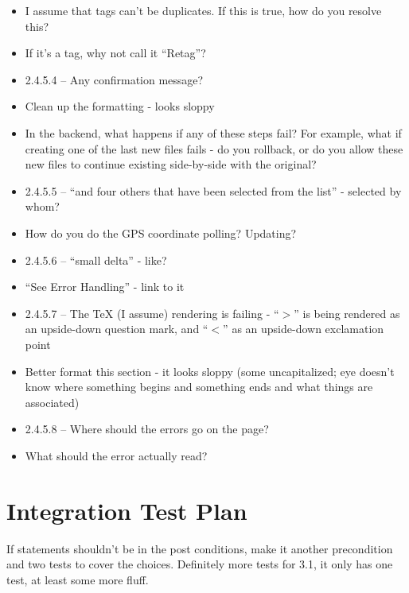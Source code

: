 \documentclass{article}
\begin{document}
\begin{itemize}
\begin{itemize}
\begin{itemize}
            \item I assume that tags can't be duplicates.  If this is true, how do you resolve this?
            \item If it's a tag, why not call it ``Retag''?
            \item 2.4.5.4 -- Any confirmation message?
            \item Clean up the formatting - looks sloppy
            \item In the backend, what happens if any of these steps fail?  For example, what if creating one of the last new files fails - do you rollback, or do you allow these new files to continue existing side-by-side with the original?
            \item 2.4.5.5 -- ``and four others that have been selected from the list'' - selected by whom?
            \item How do you do the GPS coordinate polling?  Updating?
            \item 2.4.5.6 -- ``small delta'' - like?
            \item ``See Error Handling'' - link to it
            \item 2.4.5.7 -- The TeX (I assume) rendering is failing - ``$>$'' is being rendered as an upside-down question mark, and ``$<$'' as an upside-down exclamation point
            \item Better format this section - it looks sloppy (some uncapitalized; eye doesn't know where something begins and something ends and what things are associated)
            \item 2.4.5.8 -- Where should the errors go on the page?  
            \item What should the error actually read?
        \end{itemize}
    \end{itemize}
\end{itemize}


\section{Integration Test Plan}

If statements shouldn't be in the post conditions, make it another precondition
and two tests to cover the choices.  Definitely more tests for 3.1, it only has
one test, at least some more fluff.
\end{document}
